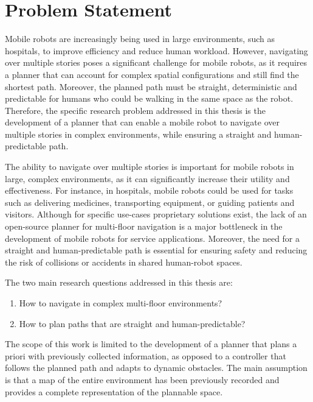 \section{Problem Statement}
\label{sec:problem_statement}
Mobile robots are increasingly being used in large environments, such as hospitals, to improve efficiency and reduce human workload. However, navigating over multiple stories poses a significant challenge for mobile robots, as it requires a planner that can account for complex spatial configurations and still find the shortest path. Moreover, the planned path must be straight, deterministic and predictable for humans who could be walking in the same space as the robot. Therefore, the specific research problem addressed in this thesis is the development of a planner that can enable a mobile robot to navigate over multiple stories in complex environments, while ensuring a straight and human-predictable path. 

The ability to navigate over multiple stories is important for mobile robots in large, complex environments, as it can significantly increase their utility and effectiveness. For instance, in hospitals, mobile robots could be used for tasks such as delivering medicines, transporting equipment, or guiding patients and visitors. Although for specific use-cases proprietary solutions exist, the lack of an open-source planner for multi-floor navigation is a major bottleneck in the development of mobile robots for service applications. Moreover, the need for a straight and human-predictable path is essential for ensuring safety and reducing the risk of collisions or accidents in shared human-robot spaces.

The two main research questions addressed in this thesis are:
\begin{enumerate}
    \item How to navigate in complex multi-floor environments?
    \item How to plan paths that are straight and human-predictable?
\end{enumerate}

The scope of this work is limited to the development of a planner that plans a priori with previously collected information, as opposed to a controller that follows the planned path and adapts to dynamic obstacles. The main assumption is that a map of the entire environment has been previously recorded and provides a complete representation of the plannable space.

